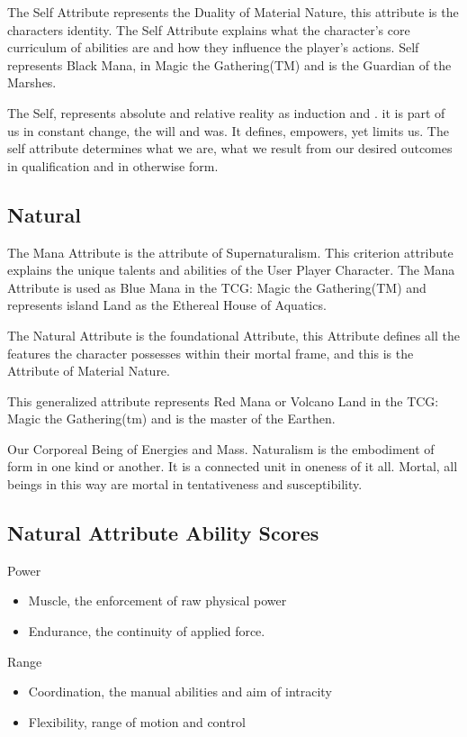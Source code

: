 \documentclass{article}
\begin{document}
The Self Attribute represents the Duality of Material Nature, this attribute is the characters identity. The Self Attribute explains what the character's core curriculum of abilities are and how they influence the player's actions. Self represents Black Mana, in Magic the Gathering(TM) and is the Guardian of the Marshes.

The Self, represents absolute and relative reality as induction and . it is part of us in constant change, the will and was. It defines, empowers, yet limits us. The self attribute determines what we are, what we result from our desired outcomes in qualification and in otherwise form.

\subsection{Natural}

The Mana Attribute is the attribute of Supernaturalism. This criterion attribute explains the unique talents and abilities of the User Player Character. The Mana Attribute is used as Blue Mana in the TCG: Magic the Gathering(TM) and represents island Land as the Ethereal House of Aquatics.

The Natural Attribute is the foundational Attribute, this Attribute defines all the features the character possesses within their mortal frame, and this is the Attribute of Material Nature.

This generalized attribute represents Red Mana or Volcano Land in the TCG: Magic the Gathering(tm) and is the master of the Earthen.

Our Corporeal Being of Energies and Mass. Naturalism is the embodiment of form in one kind or another. It is a connected unit in oneness of it all. Mortal, all beings in this way are mortal in tentativeness and susceptibility.

\subsection*{Natural Attribute Ability Scores}

Power
\begin{itemize}
\item Muscle, the enforcement of raw physical power
\item Endurance, the continuity of applied force.
\end{itemize}

Range
\begin{itemize}
\item Coordination, the manual abilities and aim of intracity
\item Flexibility, range of motion and control
\end{itemize}
\end{document}
